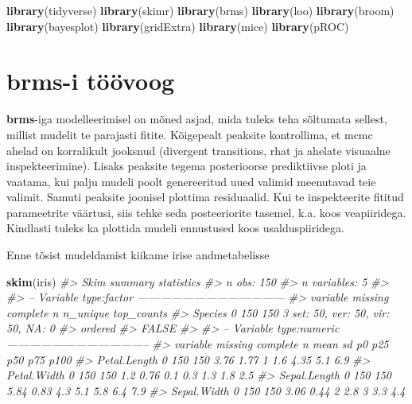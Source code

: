 \documentclass[]{book}
\newenvironment{Shaded}{\begin{snugshade}}{\end{snugshade}}
\newcommand{\KeywordTok}[1]{\textcolor[rgb]{0.13,0.29,0.53}{\textbf{#1}}}
\newcommand{\CommentTok}[1]{\textcolor[rgb]{0.56,0.35,0.01}{\textit{#1}}}
\newcommand{\NormalTok}[1]{#1}
\begin{document}
\begin{Shaded}
\begin{Highlighting}[]
\KeywordTok{library}\NormalTok{(tidyverse)}
\KeywordTok{library}\NormalTok{(skimr)}
\KeywordTok{library}\NormalTok{(brms)}
\KeywordTok{library}\NormalTok{(loo)}
\KeywordTok{library}\NormalTok{(broom)}
\KeywordTok{library}\NormalTok{(bayesplot)}
\KeywordTok{library}\NormalTok{(gridExtra)}
\KeywordTok{library}\NormalTok{(mice)}
\KeywordTok{library}\NormalTok{(pROC)}
\end{Highlighting}
\end{Shaded}

\section{brms-i töövoog}\label{brms-i-toovoog}

\textbf{brms}-iga modelleerimisel on mõned asjad, mida tuleks teha
sõltumata sellest, millist mudelit te parajasti fitite. Kõigepealt
peaksite kontrollima, et mcmc ahelad on korralikult jooksnud (divergent
transitions, rhat ja ahelate visuaalne inspekteerimine). Lisaks peaksite
tegema posterioorse prediktiivse ploti ja vaatama, kui palju mudeli
poolt genereeritud uued valimid meenutavad teie valimit. Samuti peaksite
joonisel plottima residuaalid. Kui te inspekteerite fititud parameetrite
väärtusi, siis tehke seda posteeriorite tasemel, k.a. koos veapiiridega.
Kindlasti tuleks ka plottida mudeli ennustused koos usalduspiiridega.

Enne tõsist mudeldamist kiikame irise andmetabelisse

\begin{Shaded}
\begin{Highlighting}[]
\KeywordTok{skim}\NormalTok{(iris)}
\CommentTok{#> Skim summary statistics}
\CommentTok{#>  n obs: 150 }
\CommentTok{#>  n variables: 5 }
\CommentTok{#> }
\CommentTok{#> -- Variable type:factor ---------------------------------------}
\CommentTok{#>  variable missing complete   n n_unique                       top_counts}
\CommentTok{#>   Species       0      150 150        3 set: 50, ver: 50, vir: 50, NA: 0}
\CommentTok{#>  ordered}
\CommentTok{#>    FALSE}
\CommentTok{#> }
\CommentTok{#> -- Variable type:numeric --------------------------------------}
\CommentTok{#>      variable missing complete   n mean   sd  p0 p25  p50 p75 p100}
\CommentTok{#>  Petal.Length       0      150 150 3.76 1.77 1   1.6 4.35 5.1  6.9}
\CommentTok{#>   Petal.Width       0      150 150 1.2  0.76 0.1 0.3 1.3  1.8  2.5}
\CommentTok{#>  Sepal.Length       0      150 150 5.84 0.83 4.3 5.1 5.8  6.4  7.9}
\CommentTok{#>   Sepal.Width       0      150 150 3.06 0.44 2   2.8 3    3.3  4.4}
\end{Highlighting}
\end{Shaded}
\end{document}
